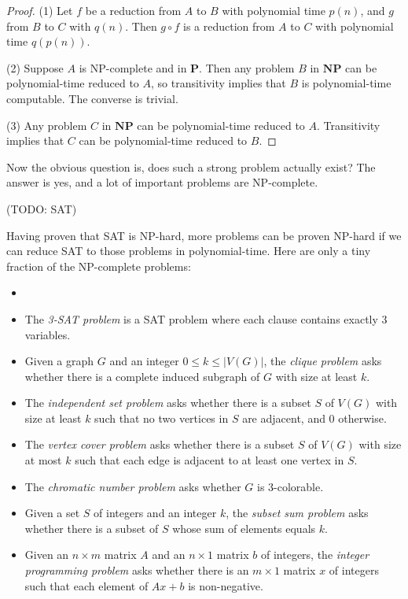         \begin{proof}
            (1) Let $f$ be a reduction from $A$ to $B$ with polynomial time $p(n)$, and $g$ from $B$ to $C$ with $q(n)$. Then $g \circ f$ is a reduction from $A$ to $C$ with polynomial time $q(p(n))$.
            
            (2) Suppose $A$ is NP-complete and in $\mathbf{P}$. Then any problem $B$ in $\mathbf{NP}$ can be polynomial-time reduced to $A$, so transitivity implies that $B$ is polynomial-time computable. The converse is trivial.
            
            (3) Any problem $C$ in $\mathbf{NP}$ can be polynomial-time reduced to $A$. Transitivity implies that $C$ can be polynomial-time reduced to $B$.
        \end{proof}
        
        Now the obvious question is, does such a strong problem actually exist? The answer is yes, and a lot of important problems are NP-complete.
        
        (TODO: SAT)
        
        Having proven that SAT is NP-hard, more problems can be proven NP-hard if we can reduce SAT to those problems in polynomial-time. Here are only a tiny fraction of the NP-complete problems:
        
        \begin{defn} \label{def_npc_examples} \begin{itemize}
            \item[]
            \item The \emph{3-SAT problem} is a SAT problem where each clause contains exactly 3 variables.
            \item Given a graph $G$ and an integer $0 \leq k \leq |V(G)|$, the \emph{clique problem} asks whether there is a complete induced subgraph of $G$ with size at least $k$.
            \item The \emph{independent set problem} asks whether there is a subset $S$ of $V(G)$ with size at least $k$ such that no two vertices in $S$ are adjacent, and 0 otherwise.
            \item The \emph{vertex cover problem} asks whether there is a subset $S$ of $V(G)$ with size at most $k$ such that each edge is adjacent to at least one vertex in $S$.
            \item The \emph{chromatic number problem} asks whether $G$ is 3-colorable.
            \item Given a set $S$ of integers and an integer $k$, the \emph{subset sum problem} asks whether there is a subset of $S$ whose sum of elements equals $k$.
            \item Given an $n \times m$ matrix $A$ and an $n \times 1$ matrix $b$ of integers, the \emph{integer programming problem} asks whether there is an $m \times 1$ matrix $x$ of integers such that each element of $Ax+b$ is non-negative.
        \end{itemize}
        \end{defn}
        
